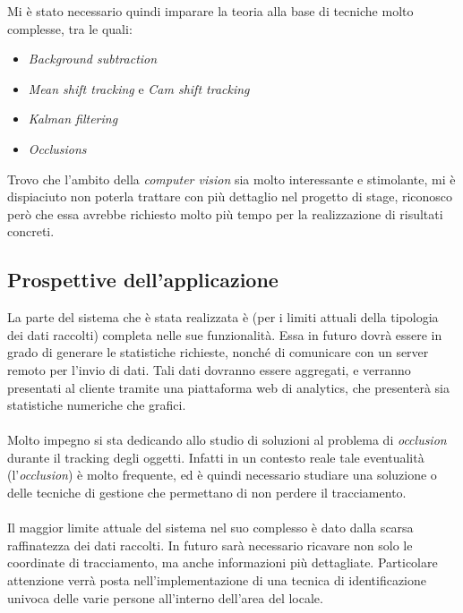 \begin{itemize}
	Mi è stato necessario quindi imparare la teoria alla base di tecniche molto complesse, tra le quali:
	\begin{itemize}
		\item \textit{Background subtraction}
		\item \textit{Mean shift tracking} e \textit{Cam shift tracking}
		\item \textit{Kalman filtering}
		\item \textit{Occlusions}
	\end{itemize}
	Trovo che l'ambito della \textit{computer vision} sia molto interessante e stimolante, mi è dispiaciuto non poterla trattare con più dettaglio nel progetto di stage, riconosco però che essa avrebbe richiesto molto più tempo per la realizzazione di risultati concreti.
\end{itemize}

\subsection{Prospettive dell'applicazione}
La parte del sistema che è stata realizzata è (per i limiti attuali della tipologia dei dati raccolti) completa nelle sue funzionalità. Essa in futuro dovrà essere in grado di generare le statistiche richieste, nonché di comunicare con un server remoto per l'invio di dati. Tali dati dovranno essere aggregati, e verranno presentati al cliente tramite una piattaforma web di analytics, che presenterà sia statistiche numeriche che grafici. \\ \\
Molto impegno si sta dedicando allo studio di soluzioni al problema di \textit{occlusion} durante il tracking degli oggetti. Infatti in un contesto reale tale eventualità (l'\textit{occlusion}) è molto frequente, ed è quindi necessario studiare una soluzione o delle tecniche di gestione che permettano di non perdere il tracciamento.\\ \\
Il maggior limite attuale del sistema nel suo complesso è dato dalla scarsa raffinatezza dei dati raccolti. In futuro sarà necessario ricavare non solo le coordinate di tracciamento, ma anche informazioni più dettagliate. Particolare attenzione verrà posta nell'implementazione di una tecnica di identificazione univoca delle varie persone all'interno dell'area del locale. 



